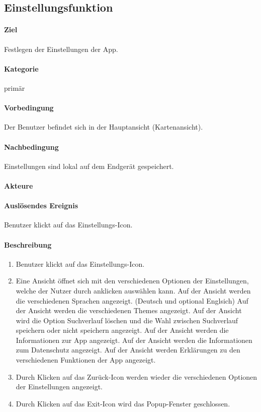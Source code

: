 \subsection{Einstellungsfunktion}
\label{Einstellungsfunktion}
\paragraph{Ziel}
Festlegen der Einstellungen der App.
\paragraph{Kategorie}
primär
\paragraph{Vorbedingung}
Der Benutzer befindet sich in der Hauptansicht (Kartenansicht).
\paragraph{Nachbedingung}
Einstellungen sind lokal auf dem Endgerät gespeichert.
\paragraph{Akteure}

\paragraph{Auslösendes Ereignis}
Benutzer klickt auf das Einstellungs-Icon.
\paragraph{Beschreibung}
\begin{enumerate}
    \item Benutzer klickt auf das Einstellungs-Icon.
    \item Eine Ansicht öffnet sich mit den verschiedenen Optionen der Einstellungen, welche der Nutzer durch anklicken auswählen kann.
     Auf der Ansicht werden die verschiedenen Sprachen angezeigt. (Deutsch und optional Englsich)
     Auf der Ansicht werden die verschiedenen Themes angezeigt.
     Auf der Ansicht wird die Option Suchverlauf löschen und die Wahl zwischen Suchverlauf speichern oder nicht speichern angezeigt.
     Auf der Ansicht werden die Informationen zur App angezeigt.
     Auf der Ansicht werden die Informationen zum Datenschutz angezeigt.
     Auf der Ansicht werden Erklärungen zu den verschiedenen Funktionen der App angezeigt.
    \item Durch Klicken auf das Zurück-Icon werden wieder die verschiedenen Optionen der Einstellungen angezeigt.
    \item Durch Klicken auf das Exit-Icon wird das Popup-Fenster geschlossen.
\end{enumerate}